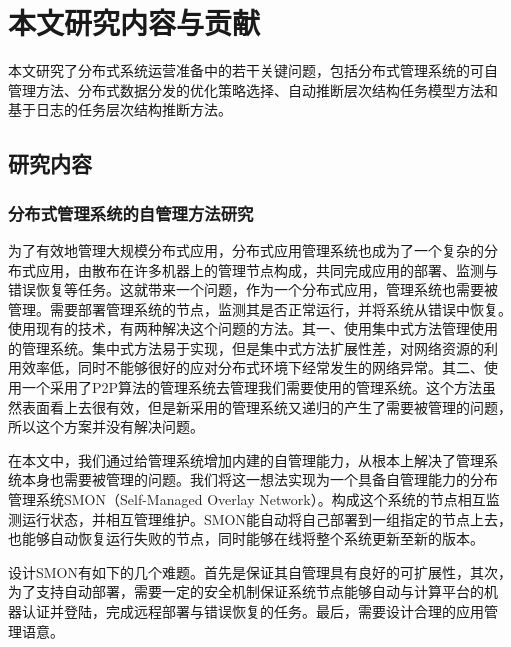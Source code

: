 % 
% 
% 
% 
% 
% 
% 
% 
% 
% 


\section{本文研究内容与贡献}
\label{sec:intro_contrib}

本文研究了分布式系统运营准备中的若干关键问题，包括分布式管理系统的可自
管理方法、分布式数据分发的优化策略选择、自动推断层次结构任务模型方法和
基于日志的任务层次结构推断方法。

\subsection{研究内容}

\subsubsection*{分布式管理系统的自管理方法研究}

为了有效地管理大规模分布式应用，分布式应用管理系统也成为了一个复杂的分
布式应用，由散布在许多机器上的管理节点构成，共同完成应用的部署、监测与
错误恢复等任务。这就带来一个问题，作为一个分布式应用，管理系统也需要被
管理。需要部署管理系统的节点，监测其是否正常运行，并将系统从错误中恢复。
使用现有的技术，有两种解决这个问题的方法。其一、使用集中式方法管理使用
的管理系统。集中式方法易于实现，但是集中式方法扩展性差，对网络资源的利
用效率低，同时不能够很好的应对分布式环境下经常发生的网络异常。其二、使
用一个采用了P2P算法的管理系统去管理我们需要使用的管理系统。这个方法虽
然表面看上去很有效，但是新采用的管理系统又递归的产生了需要被管理的问题，
所以这个方案并没有解决问题。

在本文中，我们通过给管理系统增加内建的自管理能力，从根本上解决了管理系
统本身也需要被管理的问题。我们将这一想法实现为一个具备自管理能力的分布
管理系统SMON（Self-Managed Overlay Network）。构成这个系统的节点相互监
测运行状态，并相互管理维护。SMON能自动将自己部署到一组指定的节点上去，
也能够自动恢复运行失败的节点，同时能够在线将整个系统更新至新的版本。

设计SMON有如下的几个难题。首先是保证其自管理具有良好的可扩展性，其次，
为了支持自动部署，需要一定的安全机制保证系统节点能够自动与计算平台的机
器认证并登陆，完成远程部署与错误恢复的任务。最后，需要设计合理的应用管
理语意。

